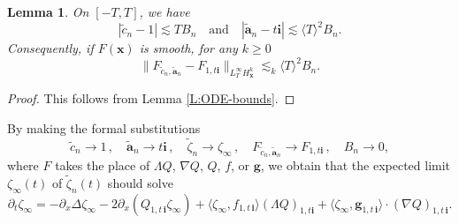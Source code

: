 \documentclass[12pt,letterpaper]{amsart}
\newcommand{\la}{\langle}
\newcommand{\ra}{\rangle}
\newtheorem{lemma}[theorem]{Lemma}
\theoremstyle{remark}
\numberwithin{equation}{section}
\numberwithin{theorem}{section}
\numberwithin{table}{section}
\begin{document}
\begin{lemma}
\label{L:param-conv}
On $[-T,T]$, we have
$$
|\tilde c_n -1 | \lesssim TB_n \quad \mbox{and} \quad |\tilde{\mathbf{a}}_n - t \mathbf{i}| \lesssim \la T\ra^2 B_n.
$$
Consequently, if $F(\mathbf{x})$ is smooth, for any $k\geq 0$
$$
\| F_{\tilde c_n, \tilde{\mathbf{a}}_n} - F_{1,t \mathbf{i}} \|_{L_T^\infty H_{\mathbf{x}}^k} \lesssim_k \la T \ra^2 B_n.
$$
\end{lemma}
\begin{proof}
This follows from Lemma \ref{L:ODE-bounds}.
\end{proof}

By making the formal substitutions
$$\tilde{c}_n \to 1 \,, \quad \tilde{\mathbf{a}}_n \to t \mathbf{i}\,, \quad  \tilde{\zeta}_n \to \zeta_\infty \,, \quad F_{\tilde c_n, \tilde{\mathbf{a}}_n} \to F_{1,t\mathbf{i}}\,, \quad B_n \to 0,$$
where $F$ takes the place of $\Lambda Q$, $\nabla Q$, $Q$, $f$, or $\mathbf{g}$, we obtain that the expected limit $\zeta_\infty(t)$ of $\tilde{\zeta}_n(t)$ should solve
\begin{equation}
\label{E:con1}
\partial_t \zeta_\infty = - \partial_x \Delta \zeta_\infty - 2 \partial_x ( Q_{1,t \,\mathbf{i}} \zeta_\infty) +  \la \zeta_\infty , f_{1,t \,\mathbf{i}} \ra (\Lambda Q)_{1,t \mathbf{i}} + \la \zeta_\infty, \mathbf{g}_{1,t\,\mathbf{i}} \ra \cdot (\nabla Q)_{1,t \,\mathbf{i}} .
\end{equation}
\end{document}
